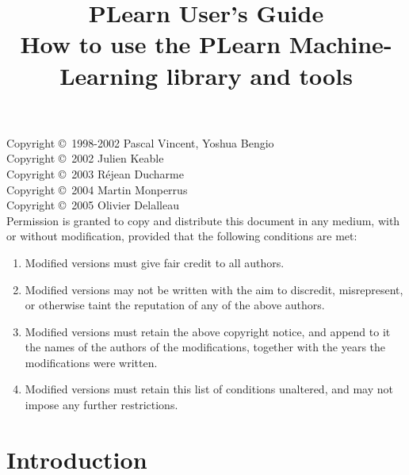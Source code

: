 \documentclass[11pt]{book}
\title{{\Huge PLearn User's Guide\\ \Large How to use the PLearn Machine-Learning library and tools}}
\begin{document}

\maketitle

\vspace*{8cm}

Copyright \copyright\ 1998-2002 Pascal Vincent, Yoshua Bengio \\
Copyright \copyright\ 2002 Julien Keable \\
Copyright \copyright\ 2003 R\'ejean Ducharme \\
Copyright \copyright\ 2004 Martin Monperrus \\
Copyright \copyright\ 2005 Olivier Delalleau \\

Permission is granted to copy and distribute this document in any medium,
with or without modification, provided that the following conditions are
met:

\begin{enumerate}
\item Modified versions must give fair credit to all authors.
\item Modified versions may not be written with the aim to discredit, misrepresent, or otherwise taint the
      reputation of any of the above authors.
\item Modified versions must retain the above copyright notice, and append to
   it the names of the authors of the modifications, together with the years the
   modifications were written.
\item Modified versions must retain this list of conditions unaltered, 
    and may not impose any further restrictions.
\end{enumerate}

\tableofcontents




\chapter*{Introduction}
\end{document}
